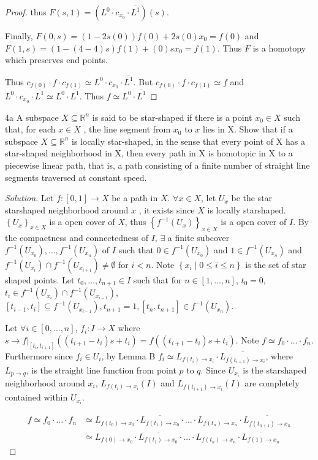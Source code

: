 \documentclass{article}
\newcommand*{\subeq}{\subseteq}
\newcommand*{\empset}{\emptyset}
\newcommand{\R}{\mathbb{R}}
\newenvironment{solution}
{\renewcommand\qedsymbol{$\blacksquare$}\begin{proof}[Solution]}
{\end{proof}}
\begin{document}
\begin{proof}
    thus $F(s, 1) = (L^0 \cdot c_{x_0} \cdot \overline{L^1})(s)$. 

    Finally, $F(0, s) = (1 - 2s(0)) f(0) + 2s(0)x_0 = f(0)$ and $F(1, s) = (1 - (4 - 4)s) f(1) + (0)s x_0 = f(1)$. Thus $F$ is a homotopy which preserves end points.     
    
    Thus $c_{f(0)} \cdot f \cdot c_{f(1)} \simeq L^0 \cdot c_{x_0} \cdot \overline{L^1}$. But $c_{f(0)} \cdot f \cdot c_{f(1)} \simeq f$ and $L^0 \cdot c_{x_0} \cdot \overline{L^1} \simeq L^0 \cdot \overline{L^1}$. Thus $f \simeq L^0 \cdot \overline{L^1}$    
\end{proof}
\begin{PROB}{4a}\label{Problem 4a.}
    A subspace $X \subeq \R^n$  is said to be star-shaped if there is a point $x_0 \in X$  such that,
for each $x \in X$ , the line segment from $x_0$ to $x$  lies in X. Show that if a subspace
$X \subeq \R^n$ is locally star-shaped, in the sense that every point of X has a star-shaped
neighborhood in X, then every path in X is homotopic in X to a piecewise linear
path, that is, a path consisting of a finite number of straight line segments traversed
at constant speed. 
\end{PROB}
\begin{solution}
    Let $f: [0, 1] \to X$ be a path in $X$. $\forall x \in X$, let $U_x$ be the star starshaped neighborhood around $x$ , it exists since $X$ is locally starshaped. $\left\{ U_x \right\}_{x \in X}$ is a open cover of $X$, thus $\left\{ f^{-1}(U_x) \right\}_{x \in X}$ is a open cover of $I$. By the compactness and connectedness of $I$, $\exists$ a finite subcover $f^{-1}(U_{x_0}), \dots, f^{-1}(U_{x_n})$ of $I$ such that $0 \in f^{-1}(U_{x_0})$ and $1 \in f^{-1}(U_{x_n})$ and $f^{-1}(U_{x_i}) \cap f^{-1}(U_{x_{i + 1}}) \neq \empset$ for $i < n$. Note $\left\{ x_i \mid 0 \leq i \leq n \right\}$ is the set of star shaped points. Let $t_0, \dots, t_{n + 1} \in I$ such that for $n \in [1, \dots, n]$, $t_0 = 0$, $t_i \in f^{-1}(U_{x_i}) \cap f^{-1}(U_{x_{i - 1}})$, $[t_{i - 1}, t_i] \subeq f^{-1}(U_{x_{i - 1}}), t_{n + 1} = 1, [t_n, t_{n + 1}] \in f^{-1}(U_{x_n})$. 
    
    Let $\forall i \in [0, \dots, n]$,  $f_i : I \to X$ where $s \to f|_{[t_{i}, t_{i + 1}]}\left((t_{i + 1} - t_i)s + t_i \right) = f((t_{i + 1} - t_i)s + t_i)$. Note $f \simeq f_0 \cdot \hdots \cdot f_n$. Furthermore since $f_i \in U_{i}$, by Lemma B $f_i \simeq L_{f(t_{i}) \to x_i} \cdot \overline{L_{f(t_{i + 1}) \to x_i}}$, where $L_{p \to q}$, is the straight line function from point $p$ to $q$. Since $U_{x_i}$ is the starshaped neighborhood around $x_i$, $L_{f(t_{i}) \to x_i}(I)$ and $L_{f(t_{i + 1}) \to x_i}(I)$ are completely contained within $U_{x_i}$. 
    
    \begin{align*}
        f \simeq f_0 \cdot \hdots \cdot f_n &\simeq L_{f(t_{0}) \to x_0} \cdot \overline{L_{f(t_{1}) \to x_0}} \cdot \hdots \cdot L_{f(t_{n}) \to x_n} \cdot \overline{L_{f(t_{n + 1}) \to x_n}} \\
        &\simeq  L_{f(0) \to x_0} \cdot \overline{L_{f(t_{1}) \to x_0}} \cdot \hdots \cdot L_{f(t_n) \to x_n} \cdot \overline{L_{f(1) \to x_n}}
    \end{align*} 
\end{solution}
\end{document}
